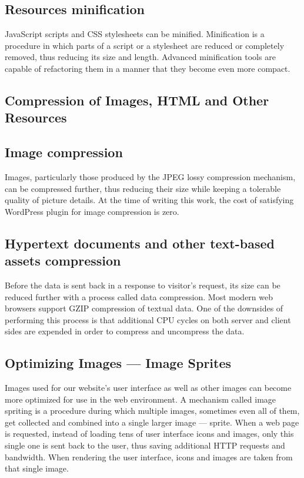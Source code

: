 \subsection*{Resources minification}

JavaScript scripts and CSS stylesheets can be minified. Minification is a procedure in which parts of a script or a stylesheet are reduced or completely removed, thus reducing its size and length. Advanced minification tools are capable of refactoring them in a manner that they become even more compact.

\subsection{Compression of Images, HTML and Other Resources}

\subsection*{Image compression}

Images, particularly those produced by the JPEG lossy compression mechanism, can be compressed further, thus reducing their size while keeping a tolerable quality of picture details. At the time of writing this work, the cost of satisfying WordPress plugin \cite{WP-Plugin:EWWW-Image-Optimizer} for image compression is zero.

\subsection*{Hypertext documents and other text-based assets compression}

Before the data is sent back in a response to visitor’s request, its size can be reduced further with a process called data compression. \cite{Study:Google-compression} Most modern web browsers \cite{Study:SO-gzip-browser-support} support GZIP compression of textual data. One of the downsides of performing this process is that additional CPU cycles on both server and client sides are expended in order to compress and uncompress the data.

\subsection{Optimizing Images — Image Sprites}

Images used for our website's user interface as well as other images can become more optimized for use in the web environment. A mechanism called image spriting \cite{Study:CSSwizardy-image-spriting} is a procedure during which multiple images, sometimes even all of them, get collected and combined into a single larger image — sprite. When a web page is requested, instead of loading tens of user interface icons and images, only this single one is sent back to the user, thus saving additional HTTP requests and bandwidth. When rendering the user interface, icons and images are taken from that single image.

